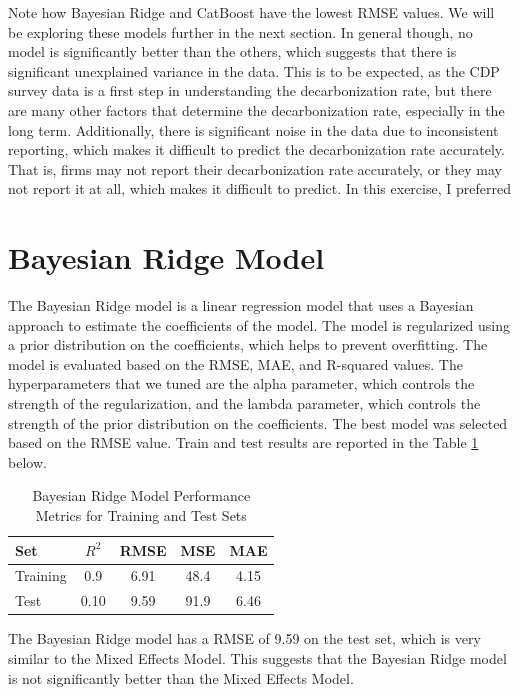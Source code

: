 

\noindent Note how Bayesian Ridge and CatBoost have the lowest RMSE values. We will be exploring these models further in the next section. In general though, no model is significantly better than the others, which suggests that there is significant unexplained variance in the data. This is to be expected, as the CDP survey data is a first step in understanding the decarbonization rate, but there are many other factors that determine the decarbonization rate, especially in the long term. Additionally, there is significant noise in the data due to inconsistent reporting, which makes it difficult to predict the decarbonization rate accurately. That is, firms may not report their decarbonization rate accurately, or they may not report it at all, which makes it difficult to predict. In this exercise, I preferred

\section{Bayesian Ridge Model}

The Bayesian Ridge model is a linear regression model that uses a Bayesian approach to estimate the coefficients of the model. The model is regularized using a prior distribution on the coefficients, which helps to prevent overfitting. The model is evaluated based on the RMSE, MAE, and R-squared values. The hyperparameters that we tuned are the alpha parameter, which controls the strength of the regularization, and the lambda parameter, which controls the strength of the prior distribution on the coefficients. The best model was selected based on the RMSE value. Train and test results are reported in the Table \ref{tab:bayesian_ridge_performance} below. 

\begin{table}[H]
    \centering
    \caption{Bayesian Ridge Model Performance Metrics for Training and Test Sets}
    \label{tab:bayesian_ridge_performance}
    \begin{tabular}{lcccc}
    \hline
    Set & $R^2$ & RMSE & MSE & MAE \\ 
    \hline
    Training & 0.9 & 6.91 & 48.4 & 4.15 \\
    Test & 0.10 & 9.59 & 91.9 & 6.46 \\
    \hline
    \end{tabular}
\end{table}
\noindent The Bayesian Ridge model has a RMSE of 9.59 on the test set, which is very similar to the Mixed Effects Model. This suggests that the Bayesian Ridge model is not significantly better than the Mixed Effects Model. 

